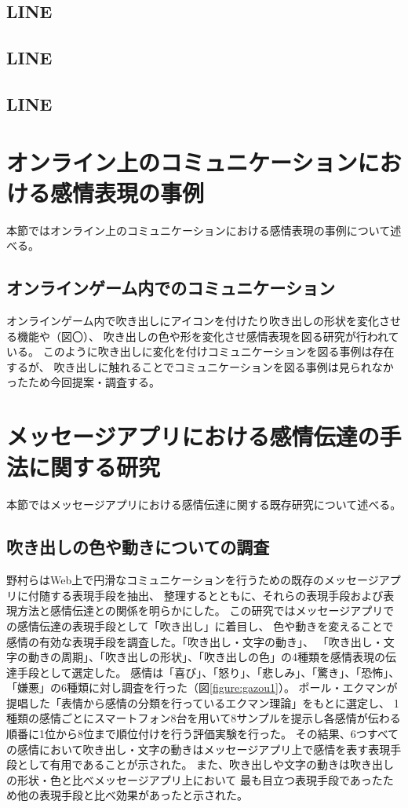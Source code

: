 \documentclass[11pt,a4paper]{ltjsreport}
\begin{document}
\subsection{LINE}

\subsection{LINE}

\subsection{LINE}

\section{オンライン上のコミュニケーションにおける感情表現の事例}
本節ではオンライン上のコミュニケーションにおける感情表現の事例について述べる。


\subsection{オンラインゲーム内でのコミュニケーション}
オンラインゲーム内で吹き出しにアイコンを付けたり吹き出しの形状を変化させる機能や（図〇）、
吹き出しの色や形を変化させ感情表現を図る研究が行われている\cite{Thesis2}。
このように吹き出しに変化を付けコミュニケーションを図る事例は存在するが、
吹き出しに触れることでコミュニケーションを図る事例は見られなかったため今回提案・調査する。

\section{メッセージアプリにおける感情伝達の手法に関する研究}
本節ではメッセージアプリにおける感情伝達に関する既存研究について述べる。

\subsection{吹き出しの色や動きについての調査}
野村ら\cite{Thesis_Nomura}はWeb上で円滑なコミュニケーションを行うための既存のメッセージアプリに付随する表現手段を抽出、
整理するとともに、それらの表現手段および表現方法と感情伝達との関係を明らかにした。
この研究ではメッセージアプリでの感情伝達の表現手段として「吹き出し」に着目し、
色や動きを変えることで感情の有効な表現手段を調査した。「吹き出し・文字の動き」、
「吹き出し・文字の動きの周期」、「吹き出しの形状」、「吹き出しの色」の4種類を感情表現の伝達手段として選定した。
感情は「喜び」、「怒り」、「悲しみ」、「驚き」、「恐怖」、「嫌悪」の6種類に対し調査を行った（図\ref{figure:gazou1}）。
ポール・エクマンが提唱した「表情から感情の分類を行っているエクマン理論」をもとに選定し、
1種類の感情ごとにスマートフォン8台を用いて8サンプルを提示し各感情が伝わる順番に1位から8位まで順位付けを行う評価実験を行った。
その結果、6つすべての感情において吹き出し・文字の動きはメッセージアプリ上で感情を表す表現手段として有用であることが示された。
また、吹き出しや文字の動きは吹き出しの形状・色と比べメッセージアプリ上において
最も目立つ表現手段であったため他の表現手段と比べ効果があったと示された。
\end{document}

